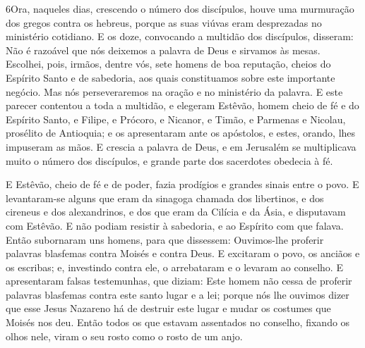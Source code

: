 \medskip

\lettrine{6} Ora, naqueles dias, crescendo o número dos
discípulos, houve uma murmuração dos gregos contra os hebreus,
porque as suas viúvas eram desprezadas no ministério cotidiano.
E os doze, convocando a multidão dos discípulos, disseram: Não é
razoável que nós deixemos a palavra de Deus e sirvamos às mesas.
Escolhei, pois, irmãos, dentre vós, sete homens de boa
reputação, cheios do Espírito Santo e de sabedoria, aos quais
constituamos sobre este importante negócio. Mas nós
perseveraremos na oração e no ministério da palavra. E este
parecer contentou a toda a multidão, e elegeram Estêvão, homem cheio
de fé e do Espírito Santo, e Filipe, e Prócoro, e Nicanor, e Timão,
e Parmenas e Nicolau, prosélito de Antioquia; e os apresentaram
ante os apóstolos, e estes, orando, lhes impuseram as mãos. E
crescia a palavra de Deus, e em Jerusalém se multiplicava muito o
número dos discípulos, e grande parte dos sacerdotes obedecia à fé.

E Estêvão, cheio de fé e de poder, fazia prodígios e grandes
sinais entre o povo. E levantaram-se alguns que eram da sinagoga
chamada dos libertinos, e dos cireneus e dos alexandrinos, e dos que
eram da Cilícia e da Ásia, e disputavam com Estêvão. E não
podiam resistir à sabedoria, e ao Espírito com que falava.
Então subornaram uns homens, para que dissessem: Ouvimos-lhe
proferir palavras blasfemas contra Moisés e contra Deus. E
excitaram o povo, os anciãos e os escribas; e, investindo contra
ele, o arrebataram e o levaram ao conselho. E apresentaram
falsas testemunhas, que diziam: Este homem não cessa de proferir
palavras blasfemas contra este santo lugar e a lei; porque
nós lhe ouvimos dizer que esse Jesus Nazareno há de destruir este
lugar e mudar os costumes que Moisés nos deu. Então todos os
que estavam assentados no conselho, fixando os olhos nele, viram o
seu rosto como o rosto de um anjo.

\medskip


